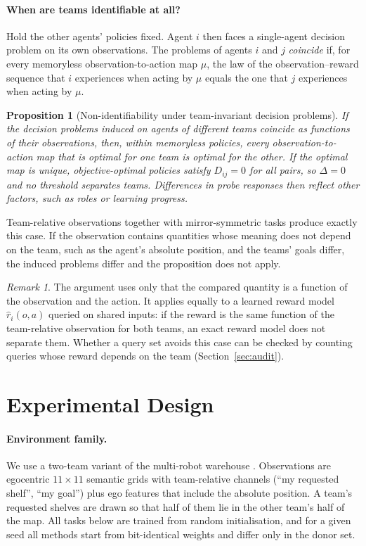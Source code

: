 \documentclass{article}
\newtheorem{proposition}{Proposition}
\theoremstyle{remark}
\newtheorem{remark}{Remark}
\begin{document}
\paragraph{When are teams identifiable at all?} Hold the other agents' policies fixed. Agent $i$ then faces a single-agent
decision problem on its own observations. The problems of agents $i$ and $j$ \emph{coincide} if, for every memoryless
observation-to-action map $\mu$, the law of the observation--reward sequence that $i$ experiences when acting by $\mu$ equals
the one that $j$ experiences when acting by $\mu$.
\begin{proposition}[Non-identifiability under team-invariant decision problems]
\label{prop:nonid}
If the decision problems induced on agents of different teams coincide as functions of their observations, then, within
memoryless policies, every observation-to-action map that is optimal for one team is optimal for the other. If the optimal map
is unique, objective-optimal policies satisfy $D_{ij}=0$ for all pairs, so $\Delta=0$ and no threshold separates teams.
Differences in probe responses then reflect other factors, such as roles or learning progress.
\end{proposition}
Team-relative observations together with mirror-symmetric tasks produce exactly this case. If the observation contains
quantities whose meaning does not depend on the team, such as the agent's absolute position, and the teams' goals differ, the
induced problems differ and the proposition does not apply.
\begin{remark}
\label{rem:reward}
The argument uses only that the compared quantity is a function of the observation and the action. It applies equally to a
learned reward model $\hat r_i(o,a)$ queried on shared inputs: if the reward is the same function of the team-relative
observation for both teams, an exact reward model does not separate them. Whether a query set avoids this case can be checked
by counting queries whose reward depends on the team (Section~\ref{sec:audit}).
\end{remark}

\section{Experimental Design}
\label{sec:setup}
\paragraph{Environment family.} We use a two-team variant of the multi-robot warehouse \cite{papoudakis2021benchmarking}.
Observations are egocentric $11\times11$ semantic grids with team-relative channels (``my requested shelf'', ``my goal'')
plus ego features that include the absolute position. A team's requested shelves are drawn so that half of them lie in the
other team's half of the map. All tasks below are trained from random initialisation, and for a given seed all methods start
from bit-identical weights and differ only in the donor set.
\end{document}
